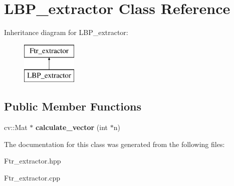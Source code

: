\hypertarget{class_l_b_p__extractor}{\section{L\+B\+P\+\_\+extractor Class Reference}
\label{class_l_b_p__extractor}
}
Inheritance diagram for L\+B\+P\+\_\+extractor\+:\begin{figure}[H]
\begin{center}
\leavevmode
\includegraphics[height=2.000000cm]{class_l_b_p__extractor}
\end{center}
\end{figure}
\subsection*{Public Member Functions}
\begin{DoxyCompactItemize}
\item 
\hypertarget{class_l_b_p__extractor_ad666d4716122f524b416fc3d26669f64}{cv\+::\+Mat $\ast$ {\bfseries calculate\+\_\+vector} (int $\ast$n)}\label{class_l_b_p__extractor_ad666d4716122f524b416fc3d26669f64}

\end{DoxyCompactItemize}


The documentation for this class was generated from the following files\+:\begin{DoxyCompactItemize}
\item 
Ftr\+\_\+extractor.\+hpp\item 
Ftr\+\_\+extractor.\+cpp\end{DoxyCompactItemize}
